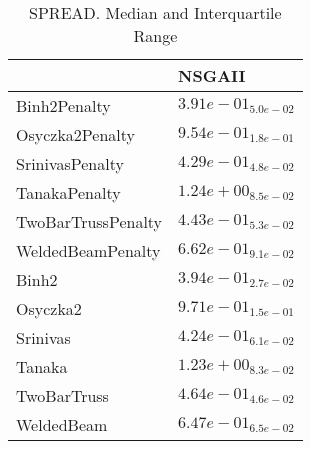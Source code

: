 \documentclass{article}
\begin{document}
\begin{table}
\caption{SPREAD. Median and Interquartile Range}
\label{table: SPREAD}
\centering
\begin{scriptsize}
\begin{tabular}{ll}
\hline &  NSGAII\\
\hline 
Binh2Penalty & \cellcolor{gray95}$  3.91e-01_{ 5.0e-02}$ \\
Osyczka2Penalty & \cellcolor{gray95}$  9.54e-01_{ 1.8e-01}$ \\
SrinivasPenalty & \cellcolor{gray95}$  4.29e-01_{ 4.8e-02}$ \\
TanakaPenalty & \cellcolor{gray95}$  1.24e+00_{ 8.5e-02}$ \\
TwoBarTrussPenalty & \cellcolor{gray95}$  4.43e-01_{ 5.3e-02}$ \\
WeldedBeamPenalty & \cellcolor{gray95}$  6.62e-01_{ 9.1e-02}$ \\
Binh2 & \cellcolor{gray95}$  3.94e-01_{ 2.7e-02}$ \\
Osyczka2 & \cellcolor{gray95}$  9.71e-01_{ 1.5e-01}$ \\
Srinivas & \cellcolor{gray95}$  4.24e-01_{ 6.1e-02}$ \\
Tanaka & \cellcolor{gray95}$  1.23e+00_{ 8.3e-02}$ \\
TwoBarTruss & \cellcolor{gray95}$  4.64e-01_{ 4.6e-02}$ \\
WeldedBeam & \cellcolor{gray95}$  6.47e-01_{ 6.5e-02}$ \\
\hline
\end{tabular}
\end{scriptsize}
\end{table}
\end{document}
